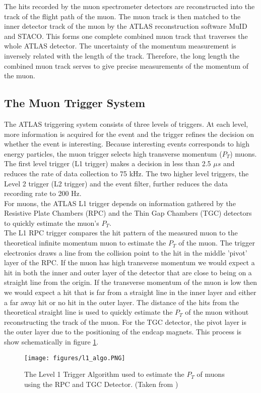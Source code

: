 \indent The hits recorded by the muon spectrometer detectors are reconstructed into the track of the flight path of the muon. The muon track is then matched to the inner detector track of the muon by the ATLAS reconstruction software MuID and STACO. This forms one complete combined muon track that traverses the whole ATLAS detector. The uncertainty of the momentum measurement is inversely related with the length of the track. Therefore, the long length the combined muon track serves to give precise measurements of the momentum of the muon. ~\\
\subsection{The Muon Trigger System}
\label{LHC:MuonTrigger}
\indent The ATLAS triggering system consists of three levels of triggers. At each level, more information is acquired for the event and the trigger refines the decision on whether the event is interesting. Because interesting events corresponds to high energy particles, the muon trigger selects high transverse momentum ($P_T$) muons. The first level trigger (L1 trigger) makes a decision in less than 2.5 ${\mu}s$ and reduces the rate of data collection to 75 kHz.\cite{biblio:JINST} The two higher level triggers, the Level 2 trigger (L2 trigger) and the event filter, further reduces the data recording rate to 200 Hz. \cite{biblio:JINST} ~\\
\indent For muons, the ATLAS L1 trigger depends on information gathered by the Resistive Plate Chambers (RPC) and the Thin Gap Chambers (TGC) detectors to quickly estimate the muon's $P_T$. ~\\
\indent The L1 RPC trigger compares the hit pattern of the measured muon to the theoretical infinite momentum muon to estimate the $P_T$ of the muon. The trigger electronics draws a line from the collision point to the hit in the middle 'pivot' layer of the RPC. If the muon has high transverse momentum we would expect a hit in both the inner and outer layer of the detector that are close to being on a straight line from the origin. If the transverse momentum of the muon is low then we would expect a hit that is far from a straight line in the inner layer and either a far away hit or no hit in the outer layer. The distance of the hits from the theoretical straight line is used to quickly estimate the $P_T$ of the muon without reconstructing the track of the muon. For the TGC detector, the pivot layer is the outer layer due to the positioning of the endcap magnets. This process is show schematically in figure \ref{LHC:fig:RPCTriggerAlg}. ~\\
\begin{figure}[h!]
\centering
\texttt{[image: figures/l1\_algo.PNG]}
\caption{ The Level 1 Trigger Algorithm used to estimate the $P_T$ of muons using the RPC and TGC Detector. (Taken from \cite{biblio:TriggerTwiki}) \label{LHC:fig:RPCTriggerAlg}}
\end{figure}

